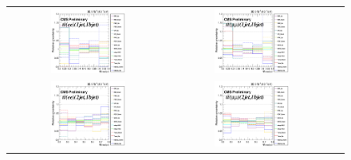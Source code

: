 \begin{figure}[ht]
  \begin{center}
    \begin{tabular}{ccc}
      \includegraphics[width=0.49\textwidth]{figures/tW/fig/Step2/uncertainties/ee/TT_Samples_H_MLP_1jet_1bjet_comb.png} &
      \includegraphics[width=0.49\textwidth]{figures/tW/fig/Step2/uncertainties/mumu/TT_Samples_H_MLP_1jet_1bjet_comb.png}\\
      \includegraphics[width=0.49\textwidth]{figures/tW/fig/Step2/uncertainties/ee/TT_Samples_H_MLP_2jet_1bjet_comb.png} &
      \includegraphics[width=0.49\textwidth]{figures/tW/fig/Step2/uncertainties/mumu/TT_Samples_H_MLP_2jet_1bjet_comb.png}\\

\end{tabular}
\end{center}
\end{figure}
